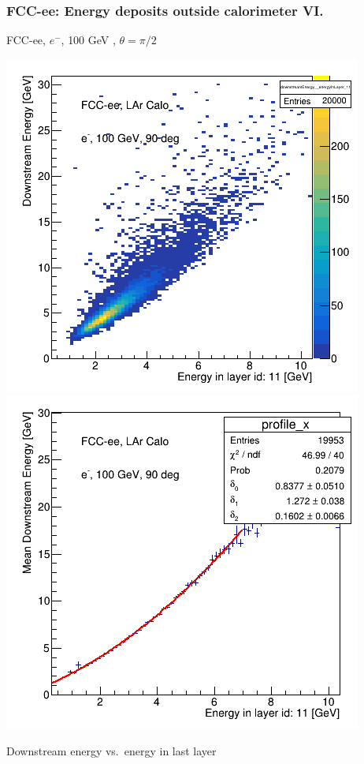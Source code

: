 \documentclass{beamer}
\newcommand{\redtext}[1]{%
  \textcolor{myRed}{#1}
}
\begin{document}
\begin{frame}
  \frametitle{FCC-ee: Energy deposits outside calorimeter VI.}

  \centering
  FCC-ee, $e^{-}$, \redtext{100 GeV}, $\theta = \pi/2$ \\[1.5ex]
  \begin{adjustwidth}{-9mm}{-9mm}
    \includegraphics[width=0.49\linewidth]{figures/12layers/hist_downstream_vs_layer_11_90deg_100GeV.png}
    \includegraphics[width=0.49\linewidth]{figures/12layers/profile_downstream_vs_layer_11_90deg_100GeV.png}
  \end{adjustwidth}
  \redtext{Downstream} energy vs.\ energy in last layer
\end{frame}
\end{document}
